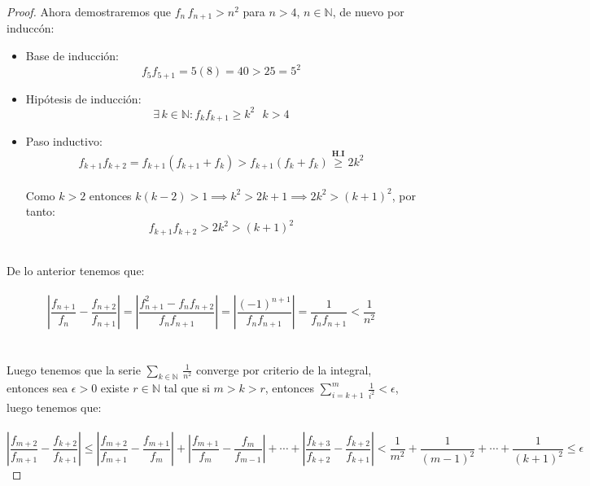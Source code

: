 \documentclass[11pt,letterpaper]{article}
\newcommand{\N}{\mathbb{N}}
\begin{document}
\begin{proof}
    Ahora demostraremos que $f_n\,f_{n+1}>n^2$ para $n>4$, $n\in\N$, de nuevo por inducc\'on:\,\\
    \begin{itemize}
        \item Base de inducci\'on:
        \begin{equation*}
            f_{5}f_{5+1}=5(8)=40>25=5^2
        \end{equation*}
        \item Hip\'otesis de inducci\'on:
        \begin{equation*}
            \exists\,k\in\N:f_{k}f_{k+1}\geq k^2\,\,\,\,k>4
        \end{equation*}
        \item Paso inductivo:
        \begin{equation*}
            f_{k+1}f_{k+2}=f_{k+1}(f_{k+1}+f_k)>f_{k+1}(f_k+f_k) \stackrel{\textbf{H.I}}{\geq}2k^2
        \end{equation*}\,\\
        Como $k>2$ entonces $k(k-2)>1\implies k^2>2k+1\implies 2k^2>(k+1)^2$, por tanto:\,\\
        \begin{equation*}
             f_{k+1}f_{k+2}>2k^2>(k+1)^2
        \end{equation*}
    \end{itemize}\,\\
    De lo anterior tenemos que:\,\\
    \,\\
    \begin{equation*}
        \left|\frac{f_{n+1}}{f_n}-\frac{f_{n+2}}{f_{n+1}}\right|=\left|\frac{f_{n+1}^2-f_nf_{n+2}}{f_nf_{n+1}}\right|=\left|\frac{(-1)^{n+1}}{f_nf_{n+1}}\right|=\frac{1}{f_nf_{n+1}}<\frac{1}{n^2}
    \end{equation*}\,\\
    \,\\
    Luego tenemos que la serie $\sum_{k\in \N}\,\frac{1}{n^2}$ converge por criterio de la integral, entonces sea $\epsilon>0$ existe $r\in \N$ tal que si $m>k>r$, entonces $\sum_{i=k+1}^m\,\frac{1}{i^2}<\epsilon$, luego tenemos que:\,\\
    \,\\
    \begin{equation*}
        \left|\frac{f_{m+2}}{f_{m+1}}-\frac{f_{k+2}}{f_{k+1}}\right|\leq\left|\frac{f_{m+2}}{f_{m+1}}-\frac{f_{m+1}}{f_{m}}\right|+\left|\frac{f_{m+1}}{f_{m}}-\frac{f_{m}}{f_{m-1}}\right|+\cdots+\left|\frac{f_{k+3}}{f_{k+2}}-\frac{f_{k+2}}{f_{k+1}}\right|<\frac{1}{m^2}+\frac{1}{(m-1)^2}+\cdots+\frac{1}{(k+1)^2}\leq \epsilon

\end{equation*}
\end{proof}
\end{document}
